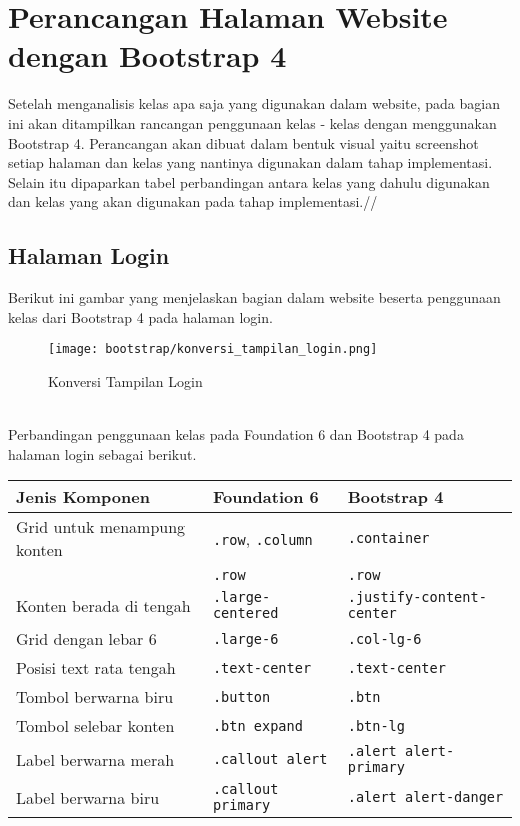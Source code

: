 \section{Perancangan Halaman Website dengan Bootstrap 4}
Setelah menganalisis kelas apa saja yang digunakan dalam website, pada bagian ini akan ditampilkan rancangan penggunaan kelas - kelas dengan menggunakan Bootstrap 4. Perancangan akan dibuat dalam bentuk visual yaitu screenshot setiap halaman dan kelas yang nantinya digunakan dalam tahap implementasi. Selain itu dipaparkan tabel perbandingan antara kelas yang dahulu digunakan dan kelas yang akan digunakan pada tahap implementasi.//
\subsection{Halaman Login}
\noindent Berikut ini gambar yang menjelaskan bagian dalam website beserta penggunaan kelas dari Bootstrap 4 pada halaman login.\\
\begin{figure} [H]
	\centering  
	\texttt{[image: bootstrap/konversi\_tampilan\_login.png]}  
	\caption{Konversi Tampilan Login} 
\end{figure} \noindent \\

\noindent Perbandingan penggunaan kelas pada Foundation 6 dan Bootstrap 4 pada halaman login sebagai berikut.\\
\begin{tabular}{| p{} | p{} | p{} |} 
	\hline
	\textbf{Jenis Komponen} & \textbf{Foundation 6} & \textbf{Bootstrap 4}  \\ [0.5ex] 
	\hline
	Grid untuk menampung konten & \texttt{.row}, \texttt{.column} &\texttt{.container}    \\	
	& \texttt{.row} &\texttt{.row}     \\  
	\hline
	Konten berada di tengah &\texttt{.large-centered} &\texttt{.justify-content-center} \\  
	\hline
	Grid dengan lebar 6 &\texttt{.large-6} &\texttt{.col-lg-6}    \\ 
	\hline
	Posisi text rata tengah  &\texttt{.text-center} & \texttt{.text-center }  \\ 
	\hline
	Tombol berwarna biru &\texttt{.button} & \texttt{.btn}   \\ 
	\hline
	Tombol selebar konten & \texttt{.btn expand} & \texttt{.btn-lg}  \\ 
	\hline
	Label berwarna merah & \texttt{.callout alert} & \texttt{.alert alert-primary}  \\ 
	\hline
	Label berwarna biru & \texttt{.callout primary} & \texttt{.alert alert-danger}  \\ [1ex]
	\hline
\end{tabular}


